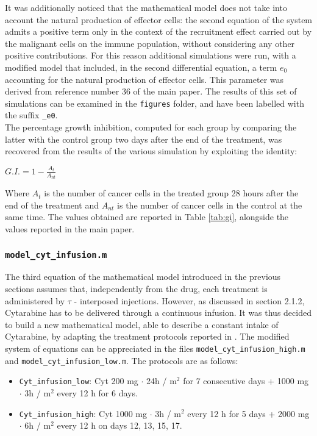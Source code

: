 It was additionally noticed that the mathematical model does not take into account the natural production of effector cells: the second equation of the system admits a positive term only in the context of the recruitment effect carried out by the malignant cells on the immune population, without considering any other positive contributions. For this reason additional simulations were run, with a modified model that included, in the second differential equation, a term $e_0$ accounting for the natural production of effector cells. This parameter was derived from reference number 36 of the main paper. The results of this set of simulations can be examined in the \texttt{figures} folder, and have been labelled with the suffix \texttt{\_e0}.\\
The percentage growth inhibition, computed for each group by comparing the latter with the control group two days after the end of the treatment, was recovered from the results of the various simulation by exploiting the identity:

$G.I. = 1 - \frac{A_t}{A_{nt}}$ 

Where $A_t$ is the number of cancer cells in the treated group 28 hours after the end of the treatment and $A_{nt}$ is the number of cancer cells in the control at the same time. The values obtained are reported in Table \ref{tab:gi}, alongside the values reported in the main paper.

\subsubsection{\texttt{model\_cyt\_infusion.m}}
The third equation of the mathematical model introduced in the previous sections assumes that, independently from the drug, each treatment is administered by $\tau$ - interposed injections. However, as discussed in section 2.1.2, Cytarabine has to be delivered through a continuous infusion. 
It was thus decided to build a new mathematical model, able to describe a constant intake of Cytarabine, by adapting the treatment protocols reported in \cite{cyt-3}. The modified system of equations can be appreciated in the files \texttt{model\_cyt\_infusion\_high.m} and \texttt{model\_cyt\_infusion\_low.m}. The protocols are as follows:

\begin{itemize}
	\item \texttt{Cyt\_infusion\_low}: Cyt 200 mg $\cdot$ 24h / m$^2$ for 7 consecutive days + 1000 mg $\cdot$ 3h / m$^2$ every 12 h for 6 days.
	\item \texttt{Cyt\_infusion\_high}: Cyt 1000 mg $\cdot$ 3h / m$^2$ every 12 h for 5 days + 2000 mg $\cdot$ 6h / m$^2$ every 12 h on days 12, 13, 15, 17.
\end{itemize}

